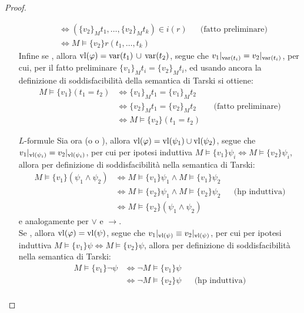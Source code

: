 \begin{proof}
\begin{itemize}
\begin{align*}
                &\iff (\{v_2\}_M t_1,\ldots,\{v_2\}_M t_k) \in i(r) &&\text{(fatto preliminare)} \\
                &\iff M \models \{v_2\} r(t_1,\ldots,t_k)
            \end{align*}
            Infine se , allora $\vl(\varphi) = \var(t_1) \,\cup\, \var(t_2)$, segue che $v_1|_{\var(t_i)} = v_2|_{\var(t_i)}$, per cui, per il fatto preliminare $\{v_1\}_M t_i = \{v_2\}_M t_i$, ed usando ancora la definizione di soddisfacibilità della semantica di Tarski si ottiene:
            \begin{align*}
                M \models \{v_1\} (t_1 = t_2) &\iff \{v_1\}_M t_1 = \{v_1\}_M t_2 \\
                &\iff \{v_2\}_M t_1 = \{v_2\}_M t_2 &&\text{(fatto preliminare)} \\
                &\iff M \models \{v_2\} (t_1 = t_2)
            \end{align*}
        \item [$\boxed{\text{$L$-formule}}$] Sia ora  (o  o ), allora $\operatorname{vl}(\varphi) = \operatorname{vl}(\psi_1) \cup \operatorname{vl}(\psi_2)$, segue che $v_1|_{\operatorname{vl}(\psi_i)} = v_2|_{\operatorname{vl}(\psi_i)}$, per cui per ipotesi induttiva $M \models \{v_1\} \psi_i \iff M \models \{v_2\} \psi_i$, allora per definizione di soddisfacibilità nella semantica di Tarski:
            \begin{align*}
                M \models \{v_1\} (\psi_1 \land \psi_2) &\iff M \models \{v_1\} \psi_1 \land M \models \{v_1\} \psi_2 \\
                &\iff M 
                \models \{v_2\} \psi_1 \land M \models \{v_2\} 	\psi_2 &&\text{(hp induttiva)} \\
                &\iff M \models \{v_2\} (\psi_1 \land \psi_2)
            \end{align*}
            e analogamente per $\lor$ e $\to$.\\
            Se \purple{$\varphi = \neg \psi$}, allora $\operatorname{vl}(\varphi) = \operatorname{vl}(\psi)$, segue che $v_1|_{\operatorname{vl}(\psi)} \equiv v_2|_{\operatorname{vl}(\psi)}$, per cui per ipotesi induttiva $M \models \{v_1\} \psi \iff M \models \{v_2\} \psi$, allora per definizione di soddisfacibilità nella semantica di Tarski:
            \begin{align*}
                M \models \{v_1\} \neg \psi &\iff \neg M \models \{v_1\} \psi \\
                &\iff \neg M \models \{v_2\} \psi &&\text{(hp induttiva)}\\

\end{align*}
\end{itemize}
\end{proof}

